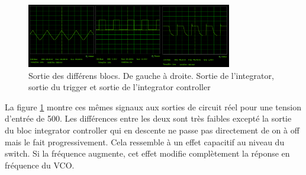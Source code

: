 \begin{figure}[ht]                                       
	\centering
	\includegraphics[width=0.8\textwidth]{img-vco/vco_real_out.png}
	\caption{Sortie des différens blocs. De gauche à droite. Sortie de l'integrator, sortie du trigger et sortie de l'integrator controller}
	\label{fig:out_vco_real}
\end{figure}
La figure \ref{fig:out_vco_real} montre ces mêmes signaux aux sorties de circuit réel pour une tension d'entrée de \unit{500}{\milli\volt}. Les différences entre les deux sont très faibles excepté la sortie du bloc integrator controller qui en descente ne passe pas directement de on à off mais le fait progressivement. Cela ressemble à un effet capacitif au niveau du switch. Si la fréquence augmente, cet effet modifie complètement la réponse en fréquence du VCO.

